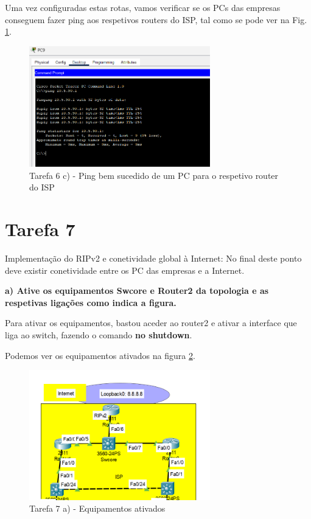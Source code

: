 \documentclass[11pt,english, openright, oneside]{book}
\begin{document}
Uma vez configuradas estas rotas, vamos verificar se os PCs das empresas conseguem fazer ping aos respetivos routers do ISP, tal como se pode ver na Fig. \ref{fig:6.c_ping}.
\vspace{0.2cm}

\begin{figure}[H]
    \centering
    \includegraphics[width=0.7\textwidth]{imagens/Tarefa6/6.c_Ping.png}
    \caption{Tarefa 6 c) - Ping bem sucedido de um PC para o respetivo router do ISP}
    \label{fig:6.c_ping}
\end{figure}

\vspace{0.8cm}
\pagebreak
\section{Tarefa 7}
\vspace{0.2cm}

Implementação do RIPv2 e conetividade global à Internet: No final deste ponto deve existir conetividade entre os PC das empresas e a Internet.  
\vspace{0.8cm}

\textbf{a) Ative os equipamentos Swcore e Router2 da topologia e as respetivas ligações como indica a figura.}
\vspace{0.2cm}


Para ativar os equipamentos, bastou aceder ao router2 e ativar a interface que liga ao switch, fazendo o comando \textbf{no shutdown}. 
\par Podemos ver os equipamentos ativados na figura \ref{fig:7.a}.
\vspace{0.2cm}

\begin{figure}[H]
    \centering
    \includegraphics[width=0.7\textwidth]{imagens/Tarefa7/7.a.png}
    \caption{Tarefa 7 a) - Equipamentos ativados}
    \label{fig:7.a}
\end{figure}
\end{document}
